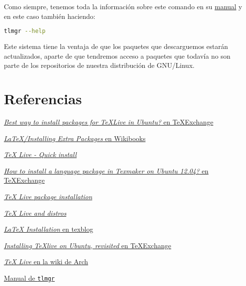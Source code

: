 Como siempre, tenemos toda la información sobre este comando en su
\href{https://www.tug.org/texlive/doc/tlmgr.html}{manual} y en este caso
también haciendo:

\begin{lstlisting}[language=bash]
tlmgr --help
\end{lstlisting}

Este sistema tiene la ventaja de que los paquetes que descarguemos
estarán actualizados, aparte de que tendremos acceso a paquetes que
todavía no son parte de los repositorios de nuestra distribución de
GNU/Linux.

\section{Referencias}

\href{http://tex.stackexchange.com/questions/28528/best-way-to-install-packages-for-texlive-in-ubuntu}{\emph{Best
way to install packages for TeXLive in Ubuntu?} en TeXExchange}

\href{https://en.wikibooks.org/wiki/LaTeX/Installing_Extra_Packages}{\emph{LaTeX/Installing
Extra Packages} en Wikibooks}

\href{https://www.tug.org/texlive/quickinstall.html}{\emph{TeX Live -
Quick install}}

\href{http://tex.stackexchange.com/questions/73526/how-to-install-a-language-package-in-texmaker-on-ubuntu-12-04\#73528}{\emph{How
to install a language package in Texmaker on Ubuntu 12.04?} en
TeXExchange}

\href{https://www.tug.org/texlive/pkginstall.html}{\emph{TeX Live
package installation}}

\href{http://tug.org/texlive/distro.html}{\emph{TeX Live and distros}}

\href{http://texblog.org/2011/05/12/updating-latex-tex-live/}{\emph{LaTeX
Installation} en texblog}

\href{https://tex.stackexchange.com/questions/114623/installing-texlive-on-ubuntu-revisited}{\emph{Installing
TeXlive on Ubuntu, revisited} en TeXExchange}

\href{https://wiki.archlinux.org/index.php/TeX_Live}{\emph{TeX Live} en
la wiki de Arch}

\href{https://www.tug.org/texlive/doc/tlmgr.html}{Manual de
\lstinline!tlmgr!}
